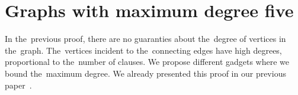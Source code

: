 \section{Graphs with maximum degree five}

In the~previous proof, there are no guaranties about
the~degree of vertices in the~graph. The~vertices incident to the~connecting edges
have high degrees, proportional to the~number of clauses.
We propose different gadgets where we bound the~maximum degree.
We already presented this proof in our previous paper~\cite{my_paper}.

%
%

